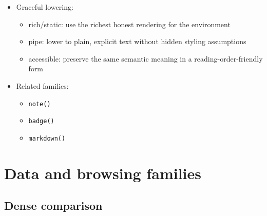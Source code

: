 \begin{itemize}
  \begin{itemize}
  \tightlist
  \item
    core authoring helper for app-defined primitives
  \end{itemize}
\item
  Graceful lowering:

  \begin{itemize}
  \tightlist
  \item
    rich/static: use the richest honest rendering for the environment
  \item
    pipe: lower to plain, explicit text without hidden styling assumptions
  \item
    accessible: preserve the same semantic meaning in a reading-order-friendly form
  \end{itemize}
\item
  Related families:

  \begin{itemize}
  \tightlist
  \item
    \texttt{n\allowbreak{}o\allowbreak{}t\allowbreak{}e\allowbreak{}(\allowbreak{})}
  \item
    \texttt{b\allowbreak{}a\allowbreak{}d\allowbreak{}g\allowbreak{}e\allowbreak{}(\allowbreak{})}
  \item
    \texttt{m\allowbreak{}a\allowbreak{}r\allowbreak{}k\allowbreak{}d\allowbreak{}o\allowbreak{}w\allowbreak{}n\allowbreak{}(\allowbreak{})}
  \end{itemize}
\end{itemize}

\section{Data and browsing families}\label{record-019-data-and-browsing-families}

\subsection{Dense comparison}\label{record-019-dense-comparison}

